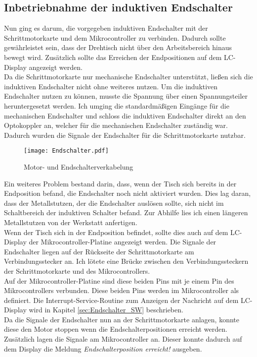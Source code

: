 \subsection{Inbetriebnahme der induktiven Endschalter}
Nun ging es darum, die vorgegeben induktiven Endschalter mit der Schrittmotorkarte und dem Mikrocontroller zu verbinden. Dadurch sollte gewährleistet sein, dass der Drehtisch nicht über den Arbeitsbereich hinaus bewegt wird. Zusätzlich sollte das Erreichen der Endpositionen auf dem LC-Display angezeigt werden.\\
Da die Schrittmotorkarte nur mechanische Endschalter unterstützt, ließen sich die induktiven Endschalter nicht ohne weiteres nutzen. Um die induktiven Endschalter nutzen zu können, musste die Spannung über einen Spannungsteiler heruntergesetzt werden. Ich umging die standardmäßigen Eingänge für die mechanischen Endschalter und schloss die induktiven Endschalter direkt an den Optokoppler an, welcher für die mechanischen Endschalter zuständig war. Dadurch wurden die Signale der Endschalter für die Schrittmotorkarte nutzbar. 
\begin{figure}[h]
\centering
\texttt{[image: Endschalter.pdf]}
\caption{Motor- und Endschalterverkabelung}
\label{fig:Motorverkabelung}
\end{figure}
Ein weiteres Problem bestand darin, dass, wenn der Tisch sich bereits in der Endposition befand, die Endschalter noch nicht aktiviert wurden. Dies lag daran, dass der Metallstutzen, der die Endschalter auslösen sollte, sich nicht im Schaltbereich der induktiven Schalter befand. Zur Abhilfe lies ich einen längeren Metallstutzen von der Werkstatt anfertigen.\\
Wenn der Tisch sich in der Endposition befindet, sollte dies auch auf dem LC-Display der Mikrocontroller-Platine angezeigt werden. Die Signale der Endschalter liegen auf der Rückseite der Schrittmotorkarte am Verbindungsstecker an. Ich lötete eine Brücke zwischen den Verbindungssteckern der Schrittmotorkarte und des Mikrocontrollers.\\
Auf der Mikrocontroller-Platine sind diese beiden Pins mit je einem Pin des Mikrocontrollers verbunden. Diese beiden Pins werden im Mikrocontroller als  definiert. Die Interrupt-Service-Routine zum Anzeigen der Nachricht auf dem LC-Display wird in Kapitel \ref{sec:Endschalter_SW} beschrieben.\\
Da die Signale der Endschalter nun an der Schrittmotorkarte anlagen, konnte diese den Motor stoppen wenn die Endschalterpositionen erreicht werden. Zusätzlich lagen die Signale am Mikrocontroller an. Dieser konnte dadurch auf dem Display die Meldung \emph{Endschalterposition erreicht!} ausgeben.


